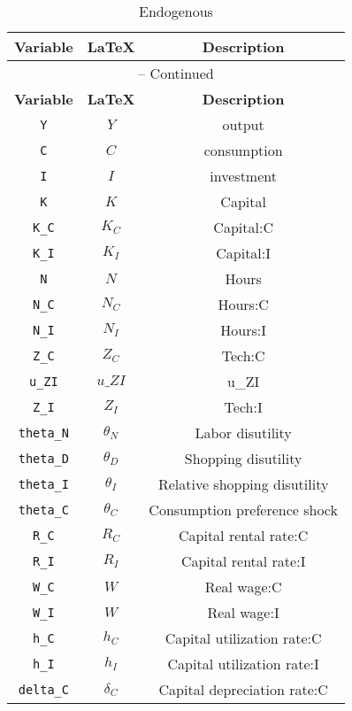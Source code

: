 \begin{center}
\begin{longtable}{ccc}
\caption{Endogenous}\\%
\hline%
\multicolumn{1}{c}{\textbf{Variable}} &
\multicolumn{1}{c}{\textbf{\LaTeX}} &
\multicolumn{1}{c}{\textbf{Description}}\\%
\hline\hline%
\endfirsthead
\multicolumn{3}{c}{{\tablename} \thetable{} -- Continued}\\%
\hline%
\multicolumn{1}{c}{\textbf{Variable}} &
\multicolumn{1}{c}{\textbf{\LaTeX}} &
\multicolumn{1}{c}{\textbf{Description}}\\%
\hline\hline%
\endhead
\texttt{Y} & ${Y}$ & output\\
\texttt{C} & ${C}$ & consumption\\
\texttt{I} & ${I}$ & investment\\
\texttt{K} & ${K}$ & Capital\\
\texttt{K\_C} & ${K_C}$ & Capital:C\\
\texttt{K\_I} & ${K_I}$ & Capital:I\\
\texttt{N} & ${N}$ & Hours\\
\texttt{N\_C} & ${N_C}$ & Hours:C\\
\texttt{N\_I} & ${N_I}$ & Hours:I\\
\texttt{Z\_C} & ${Z_C}$ & Tech:C\\
\texttt{u\_ZI} & $u\_ZI$ & u\_ZI\\
\texttt{Z\_I} & ${Z_I}$ & Tech:I\\
\texttt{theta\_N} & ${\theta_N}$ & Labor disutility\\
\texttt{theta\_D} & ${\theta_D}$ & Shopping disutility\\
\texttt{theta\_I} & ${\theta_I}$ & Relative shopping disutility\\
\texttt{theta\_C} & ${\theta_C}$ & Consumption preference shock\\
\texttt{R\_C} & ${R_C}$ & Capital rental rate:C\\
\texttt{R\_I} & ${R_I}$ & Capital rental rate:I\\
\texttt{W\_C} & ${W}$ & Real wage:C\\
\texttt{W\_I} & ${W}$ & Real wage:I\\
\texttt{h\_C} & ${h_C}$ & Capital utilization rate:C\\
\texttt{h\_I} & ${h_I}$ & Capital utilization rate:I\\
\texttt{delta\_C} & ${\delta_C}$ & Capital depreciation rate:C\\

\end{longtable}
\end{center}
